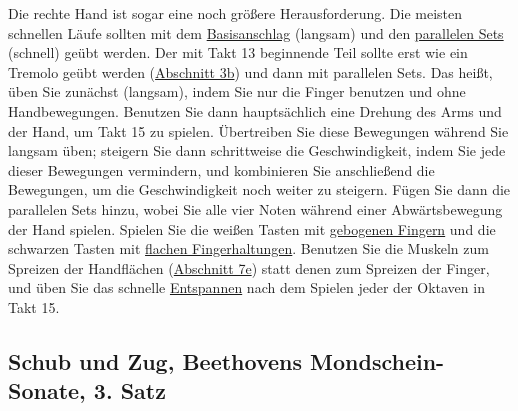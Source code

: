 Die rechte Hand ist sogar eine noch größere Herausforderung.
Die meisten schnellen Läufe sollten mit dem \hyperlink{c1iii1a1}{Basisanschlag} (langsam) und den \hyperlink{c1ii11}{parallelen Sets} (schnell) geübt werden.
Der mit Takt 13 beginnende Teil sollte erst wie ein Tremolo geübt werden (\hyperlink{c1iii3b}{Abschnitt 3b}) und dann mit parallelen Sets.
Das heißt, üben Sie zunächst (langsam), indem Sie nur die Finger benutzen und ohne Handbewegungen.
Benutzen Sie dann hauptsächlich eine Drehung des Arms und der Hand, um Takt 15 zu spielen.
Übertreiben Sie diese Bewegungen während Sie langsam üben; steigern Sie dann schrittweise die Geschwindigkeit, indem Sie jede dieser Bewegungen vermindern, und kombinieren Sie anschließend die Bewegungen, um die Geschwindigkeit noch weiter zu steigern.
Fügen Sie dann die parallelen Sets hinzu, wobei Sie alle vier Noten während einer Abwärtsbewegung der Hand spielen.
Spielen Sie die weißen Tasten mit \hyperlink{c1ii2}{gebogenen Fingern} und die schwarzen Tasten mit \hyperlink{c1iii4b}{flachen Fingerhaltungen}.
Benutzen Sie die Muskeln zum Spreizen der Handflächen (\hyperlink{c1iii7e}{Abschnitt 7e}) statt denen zum Spreizen der Finger, und üben Sie das schnelle \hyperlink{c1ii14}{Entspannen} nach dem Spielen jeder der Oktaven in Takt 15.

\hypertarget{c1iii5f}{}
\subsection{Schub und Zug, Beethovens Mondschein-Sonate, 3. Satz}\hypertarget{c1iii5SchubZug}{}

